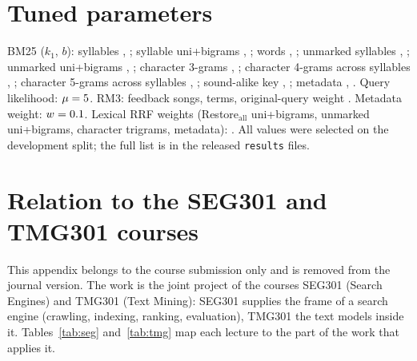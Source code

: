 \documentclass[11pt]{article}
\newif\ifcoursever\coursevertrue        %
\begin{document}
\section{Tuned parameters}\label{app:params}
BM25 ($k_1$, $b$): syllables \KoneSyl, \BSyl; syllable uni+bigrams \KoneSylBi, \BSylBi; words \KoneWord, \BWord;
unmarked syllables \KoneNodiac, \BNodiac; unmarked uni+bigrams \KoneNodiacBi, \BNodiacBi; character 3-grams
\KoneChar, \BChar; character 4-grams across syllables \KoneCharFourX, \BCharFourX; character 5-grams across
syllables \KoneCharFiveX, \BCharFiveX; sound-alike key \KonePhon, \BPhon; metadata \KoneMeta, \BMeta. Query
likelihood: $\mu = 5$. RM3: \RMthreeDocs{} feedback songs, \RMthreeTerms{} terms, original-query weight
\RMthreeOrigW. Metadata weight: $w = 0.1$. Lexical RRF weights (Restore$_{\mathrm{all}}$ uni+bigrams,
unmarked uni+bigrams, character trigrams, metadata): \FuseGlobalWeights. All values were selected on the
development split; the full list is in the released \texttt{results} files.

\ifcoursever
\section{Relation to the SEG301 and TMG301 courses}\label{app:courses}
This appendix belongs to the course submission only and is removed from the journal version. The work is the
joint project of the courses SEG301 (Search Engines) and TMG301 (Text Mining): SEG301 supplies the frame of a
search engine (crawling, indexing, ranking, evaluation), TMG301 the text models inside it. Tables~\ref{tab:seg}
and~\ref{tab:tmg} map each lecture to the part of the work that applies it.
\end{document}
